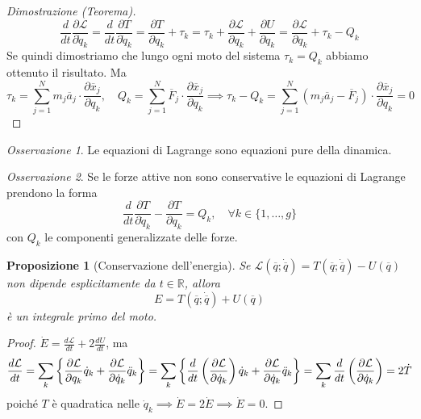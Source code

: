 \documentclass{book}
\theoremstyle{plain}
\theoremstyle{plain}
\theoremstyle{plain}
\theoremstyle{plain}
\theoremstyle{plain}
\newtheorem{prop}{Proposizione}[chapter]
\theoremstyle{definition}
\theoremstyle{remark}
\newtheorem*{oss}{Osservazione}
\theoremstyle{definition}
\begin{document}
\begin{proof}[Dimostrazione (Teorema)]
    \begin{displaymath}
        \frac{d}{dt}\frac{\partial\mathcal{L}}{\partial\Dot{q}_k}=\frac{d}{dt}\frac{\partial T}{\partial\Dot{q}_k}=\frac{\partial T}{\partial q_k}+\tau_k=\tau_k+\frac{\partial\mathcal{L}}{\partial q_k}+\frac{\partial U}{\partial q_k}=\frac{\partial\mathcal{L}}{\partial q_k}+\tau_k-Q_k
    \end{displaymath}
    Se quindi dimostriamo che lungo ogni moto del sistema $\tau_k=Q_k$ abbiamo ottenuto il risultato. Ma
    \begin{displaymath}
        \tau_k=\sum_{j=1}^N m_j\overline{a}_j \cdot \frac{\partial \overline{x}_j}{\partial q_k}, \quad Q_k=\sum_{j=1}^N\overline{F}_j\cdot \frac{\partial \overline{x}_j}{\partial q_k} \implies \tau_k-Q_k=\sum_{j=1}^N\left(m_j\overline{a}_j-\overline{F}_j\right) \cdot \frac{\partial \overline{x}_j}{\partial q_k}=0
    \end{displaymath}
\end{proof}

\begin{oss}
    Le equazioni di Lagrange sono equazioni pure della dinamica.
\end{oss}

\begin{oss}
    Se le forze attive non sono conservative le equazioni di Lagrange prendono la forma
    \begin{displaymath}
        \frac{d}{dt}\frac{\partial T}{\partial\dot{q}_k} - \frac{\partial T}{\partial q_k} = Q_k, \quad \forall k \in \{1,\ldots,g\}
    \end{displaymath}
    con $Q_k$ le componenti generalizzate delle forze.
\end{oss}

\begin{prop}[Conservazione dell'energia]
    Se $\mathcal{L}(\overline{q};\dot{\overline{q}})=T(\overline{q};\dot{\overline{q}})-U(\overline{q})$ non dipende esplicitamente da $t\in\mathbb{R}$, allora
    \begin{displaymath}
        \boxed{
        E=T(\overline{q};\dot{\overline{q}})+U(\overline{q})
        }
    \end{displaymath}
    è un integrale primo del moto.
\end{prop}

\begin{proof}
    $\Dot{E}=\frac{d\mathcal{L}}{dt}+2\frac{dU}{dt}$, ma
    \begin{displaymath}
        \frac{d\mathcal{L}}{dt}=\sum_k\left\{\frac{\partial\mathcal{L}}{\partial q_k}\Dot{q}_k+\frac{\partial\mathcal{L}}{\partial\Dot{q}_k}\Ddot{q}_k\right\}=\sum_k\left\{\frac{d}{dt}\left(\frac{\partial\mathcal{L}}{\partial\Dot{q}_k}\right)\Dot{q}_k+\frac{\partial\mathcal{L}}{\partial\Dot{q}_k}\Ddot{q}_k\right\}=\sum_k\frac{d}{dt}\left(\frac{\partial\mathcal{L}}{\partial\Dot{q}_k}\right)=2\Dot{T}
    \end{displaymath}
    poiché $T$ è quadratica nelle $\Dot{q}_k\implies\Dot{E}=2\Dot{E}\implies\Dot{E}=0$.
\end{proof}
\end{document}
